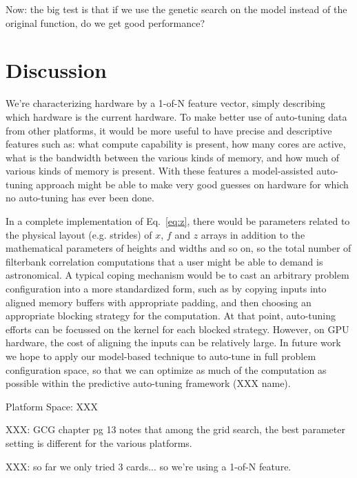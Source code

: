\documentclass{sig-alternate}
\begin{document}
Now: the big test is that if we use the genetic search on the model instead of
the original function, do we get good performance?

\section{Discussion}

We're characterizing hardware by a 1-of-N feature vector, simply describing
which hardware is the current hardware.
To make better use of auto-tuning data from other platforms, it would be more
useful to have precise and descriptive features such as: what compute
capability is present, how many cores are active, what is the bandwidth
between the various kinds of memory, and how much of various kinds of memory
is present.  With these features a model-assisted auto-tuning approach
might be able to make very good guesses on hardware for which no auto-tuning
has ever been done.

In a complete implementation of Eq.~\ref{eq:z}, there would be parameters
related to the physical layout (e.g. strides) of $x$, $f$ and $z$ arrays in
addition to the mathematical parameters of heights and widths and so on,
so the total number of filterbank correlation computations that a user might
be able to demand is astronomical.
A typical coping mechanism would be to cast an arbitrary problem configuration into a more
standardized form, such as by copying inputs into aligned memory buffers with
appropriate padding, and then choosing an appropriate blocking strategy for
the computation. At that point, auto-tuning efforts can be focussed on the
kernel for each blocked strategy. However, on GPU hardware, the cost of
aligning the inputs can be relatively large.  In future work we hope to apply
our model-based technique to auto-tune in full problem configuration space, so
that we can optimize as much of the computation as possible within the
predictive auto-tuning framework (XXX name).

Platform Space: XXX

XXX: GCG chapter pg 13 notes that among the grid search, the best parameter
setting is different for the various platforms.

XXX: so far we only tried 3 cards... so we're using a 1-of-N feature.



\end{document}
